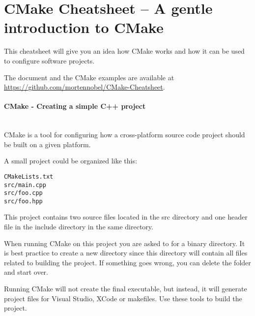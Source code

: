 \documentclass[11pt,letter,landscape]{scrartcl} %
\newcommand{\sectiontitle}[1]{\paragraph{#1} \ \\} %
\begin{document}


\section*{CMake Cheatsheet -- A gentle introduction to CMake} %



\setlength{\columnsep}{1.5cm}
\begin{multicols}{2}


This cheatsheet will give you an idea how CMake works and how it can be used to configure software projects.

The document and the CMake examples are available at  \url{https://github.com/mortennobel/CMake-Cheatsheet}.

\sectiontitle{CMake - Creating a simple C++ project}

CMake is a tool for configuring how a cross-platform source code project should be built on a given platform.

A small project could be organized like this:

\begin{verbatim}
CMakeLists.txt
src/main.cpp
src/foo.cpp
src/foo.hpp
\end{verbatim}

This project contains two source files located in the src directory and one header file in the include directory in the same directory.

When running CMake on this project you are asked to for a binary directory. It is best practice to create a new directory since this directory will contain all files related to building the project. If something goes wrong, you can delete the folder and start over.

Running CMake will not create the final executable, but instead, it will generate project files for Visual Studio, XCode or makefiles. Use these tools to build the project.


\end{multicols}
\end{document}
